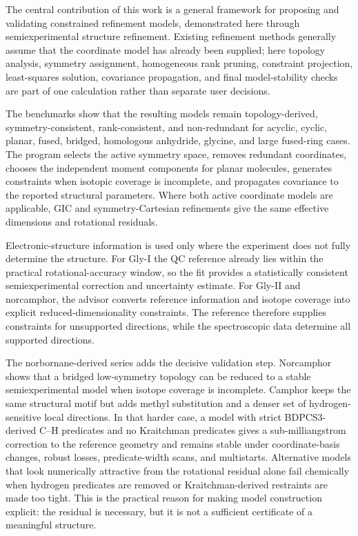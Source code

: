 \documentclass[aip,jcp,reprint,longbibliography,floatfix]{revtex4-2}
\begin{document}
The central contribution of this work is a general framework for proposing and
validating constrained refinement models, demonstrated here through
semiexperimental structure refinement. Existing refinement methods generally
assume that the coordinate model has already been supplied; here topology
analysis, symmetry assignment, homogeneous rank pruning, constraint
projection, least-squares solution, covariance propagation, and final
model-stability checks are part of one calculation rather than separate user
decisions.

The benchmarks show that the resulting models remain topology-derived,
symmetry-consistent, rank-consistent, and non-redundant for acyclic, cyclic,
planar, fused, bridged, homologous anhydride, glycine, and large fused-ring
cases. The program selects the active symmetry space, removes redundant
coordinates, chooses the independent moment components for planar molecules,
generates constraints when isotopic coverage is incomplete, and propagates
covariance to the reported structural parameters. Where both active coordinate
models are applicable, GIC and symmetry-Cartesian refinements give the same
effective dimensions and rotational residuals.

Electronic-structure information is used only where the experiment does not
fully determine the structure. For Gly-I the QC reference already lies within
the practical rotational-accuracy window, so the fit provides a statistically
consistent semiexperimental correction and uncertainty estimate. For Gly-II
and norcamphor, the advisor converts reference information and isotope
coverage into explicit reduced-dimensionality constraints. The reference
therefore supplies constraints for unsupported directions, while the
spectroscopic data determine all supported directions.

The norbornane-derived series adds the decisive validation step. Norcamphor
shows that a bridged low-symmetry topology can be reduced to a stable
semiexperimental model when isotope coverage is incomplete. Camphor keeps the
same structural motif but adds methyl substitution and a denser set of
hydrogen-sensitive local directions. In that harder case, a model with strict
BDPCS3-derived C--H predicates and no Kraitchman predicates gives a
sub-milliangstrom correction to the reference geometry and remains stable
under coordinate-basis changes, robust losses, predicate-width scans, and
multistarts. Alternative models that look numerically attractive from the
rotational residual alone fail chemically when hydrogen predicates are removed
or Kraitchman-derived restraints are made too tight. This is the practical
reason for making model construction explicit: the residual is necessary, but
it is not a sufficient certificate of a meaningful structure.
\end{document}
